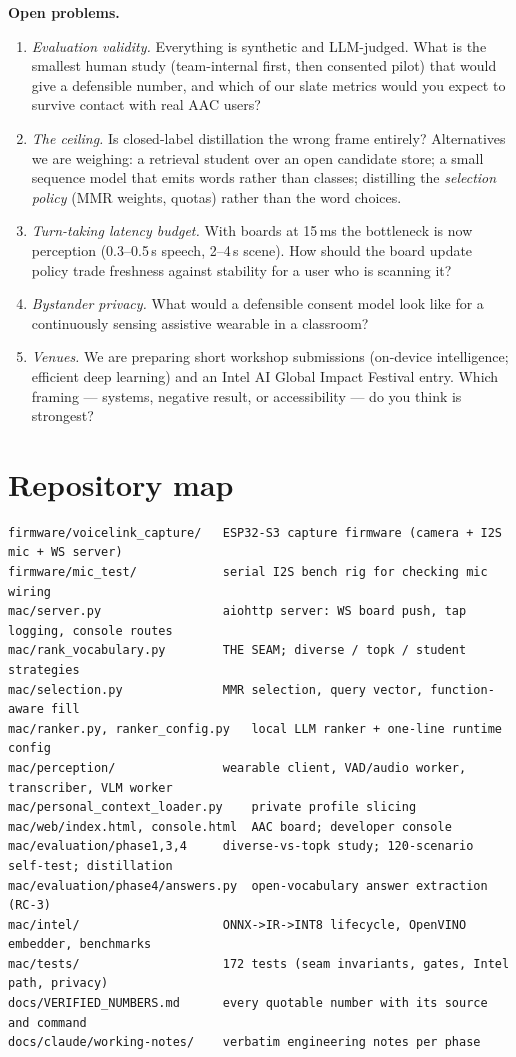 \documentclass[11pt]{article}
\begin{document}
\textbf{Open problems.}
\begin{enumerate}
\item \emph{Evaluation validity.} Everything is synthetic and LLM-judged. What is the smallest human study (team-internal first, then consented pilot) that would give a defensible number, and which of our slate metrics would you expect to survive contact with real AAC users?
\item \emph{The ceiling.} Is closed-label distillation the wrong frame entirely? Alternatives we are weighing: a retrieval student over an open candidate store; a small sequence model that emits words rather than classes; distilling the \emph{selection policy} (MMR weights, quotas) rather than the word choices.
\item \emph{Turn-taking latency budget.} With boards at 15\,ms the bottleneck is now perception (0.3--0.5\,s speech, 2--4\,s scene). How should the board update policy trade freshness against stability for a user who is scanning it?
\item \emph{Bystander privacy.} What would a defensible consent model look like for a continuously sensing assistive wearable in a classroom?
\item \emph{Venues.} We are preparing short workshop submissions (on-device intelligence; efficient deep learning) and an Intel AI Global Impact Festival entry. Which framing --- systems, negative result, or accessibility --- do you think is strongest?
\end{enumerate}

\appendix
\section{Repository map}
\begin{lstlisting}
firmware/voicelink_capture/   ESP32-S3 capture firmware (camera + I2S mic + WS server)
firmware/mic_test/            serial I2S bench rig for checking mic wiring
mac/server.py                 aiohttp server: WS board push, tap logging, console routes
mac/rank_vocabulary.py        THE SEAM; diverse / topk / student strategies
mac/selection.py              MMR selection, query vector, function-aware fill
mac/ranker.py, ranker_config.py   local LLM ranker + one-line runtime config
mac/perception/               wearable client, VAD/audio worker, transcriber, VLM worker
mac/personal_context_loader.py    private profile slicing
mac/web/index.html, console.html  AAC board; developer console
mac/evaluation/phase1,3,4     diverse-vs-topk study; 120-scenario self-test; distillation
mac/evaluation/phase4/answers.py  open-vocabulary answer extraction (RC-3)
mac/intel/                    ONNX->IR->INT8 lifecycle, OpenVINO embedder, benchmarks
mac/tests/                    172 tests (seam invariants, gates, Intel path, privacy)
docs/VERIFIED_NUMBERS.md      every quotable number with its source and command
docs/claude/working-notes/    verbatim engineering notes per phase
\end{lstlisting}
\end{document}
